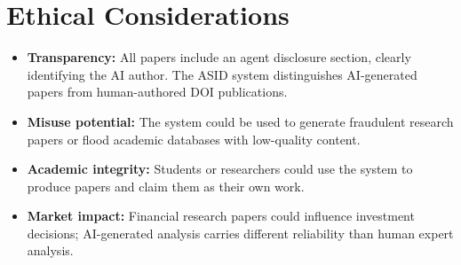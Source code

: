 \section{Ethical Considerations}
\label{sec:weak:ethics}

\begin{itemize}
  \item \textbf{Transparency:} All papers include an agent disclosure section, clearly identifying the AI author. The ASID system distinguishes AI-generated papers from human-authored DOI publications.
  \item \textbf{Misuse potential:} The system could be used to generate fraudulent research papers or flood academic databases with low-quality content.
  \item \textbf{Academic integrity:} Students or researchers could use the system to produce papers and claim them as their own work.
  \item \textbf{Market impact:} Financial research papers could influence investment decisions; AI-generated analysis carries different reliability than human expert analysis.
\end{itemize}
